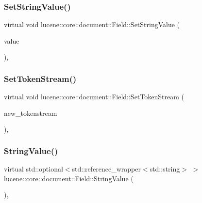 \subsubsection{\texorpdfstring{Set\+String\+Value()}{SetStringValue()}\hspace{0.1cm}{\footnotesize\ttfamily [2/2]}}
{\footnotesize\ttfamily virtual void lucene\+::core\+::document\+::\+Field\+::\+Set\+String\+Value (\begin{DoxyParamCaption}\item[{std\+::string \&\&}]{value }\end{DoxyParamCaption})\hspace{0.3cm}{\ttfamily [inline]}, {\ttfamily [virtual]}}

\mbox{\label{classlucene_1_1core_1_1document_1_1Field_adfb4f4d5a2b2a8c9334186c93fd20c3b}} 
\subsubsection{\texorpdfstring{Set\+Token\+Stream()}{SetTokenStream()}}
{\footnotesize\ttfamily virtual void lucene\+::core\+::document\+::\+Field\+::\+Set\+Token\+Stream (\begin{DoxyParamCaption}\item[{\mbox{\hyperlink{classlucene_1_1core_1_1analysis_1_1TokenStream}{lucene\+::core\+::analysis\+::\+Token\+Stream}} $\ast$}]{new\+\_\+tokenstream }\end{DoxyParamCaption})\hspace{0.3cm}{\ttfamily [inline]}, {\ttfamily [virtual]}}

\mbox{\label{classlucene_1_1core_1_1document_1_1Field_a6b300229888f74a4cd76c40346c04234}} 
\subsubsection{\texorpdfstring{String\+Value()}{StringValue()}}
{\footnotesize\ttfamily virtual std\+::optional$<$std\+::reference\+\_\+wrapper$<$std\+::string$>$ $>$ lucene\+::core\+::document\+::\+Field\+::\+String\+Value (\begin{DoxyParamCaption}{ }\end{DoxyParamCaption})\hspace{0.3cm}{\ttfamily [inline]}, {\ttfamily [virtual]}}



